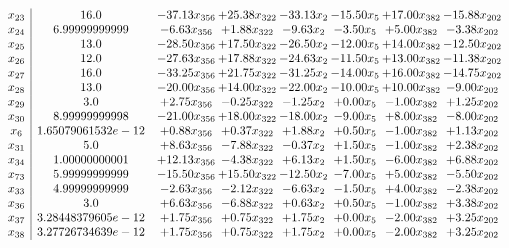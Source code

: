 \documentclass[8pt]{article}
\begin{document}
\[\begin{array}{c| c c@{\hskip 2pt} c@{\hskip 2pt} c@{\hskip 2pt} c@{\hskip 2pt} c@{\hskip 2pt} c@{\hskip 2pt} }
 x_{23}   &  16.0 & -37.13 x_{356} & + 25.38 x_{322} & -33.13 x_{2} & -15.50 x_{5} & + 17.00 x_{382} & -15.88 x_{202}\\
 x_{24}   &  6.99999999999 & -6.63 x_{356} & +  1.88 x_{322} & -9.63 x_{2} & -3.50 x_{5} & +  5.00 x_{382} & -3.38 x_{202}\\
 x_{25}   &  13.0 & -28.50 x_{356} & + 17.50 x_{322} & -26.50 x_{2} & -12.00 x_{5} & + 14.00 x_{382} & -12.50 x_{202}\\
 x_{26}   &  12.0 & -27.63 x_{356} & + 17.88 x_{322} & -24.63 x_{2} & -11.50 x_{5} & + 13.00 x_{382} & -11.38 x_{202}\\
 x_{27}   &  16.0 & -33.25 x_{356} & + 21.75 x_{322} & -31.25 x_{2} & -14.00 x_{5} & + 16.00 x_{382} & -14.75 x_{202}\\
 x_{28}   &  13.0 & -20.00 x_{356} & + 14.00 x_{322} & -22.00 x_{2} & -10.00 x_{5} & + 10.00 x_{382} & -9.00 x_{202}\\
 x_{29}   &  3.0 & +  2.75 x_{356} & -0.25 x_{322} & -1.25 x_{2} & +  0.00 x_{5} & -1.00 x_{382} & +  1.25 x_{202}\\
 x_{30}   &  8.99999999998 & -21.00 x_{356} & + 18.00 x_{322} & -18.00 x_{2} & -9.00 x_{5} & +  8.00 x_{382} & -8.00 x_{202}\\
 x_{6}   &  1.65079061532e-12 & +  0.88 x_{356} & +  0.37 x_{322} & +  1.88 x_{2} & +  0.50 x_{5} & -1.00 x_{382} & +  1.13 x_{202}\\
 x_{31}   &  5.0 & +  8.63 x_{356} & -7.88 x_{322} & -0.37 x_{2} & +  1.50 x_{5} & -1.00 x_{382} & +  2.38 x_{202}\\
 x_{34}   &  1.00000000001 & + 12.13 x_{356} & -4.38 x_{322} & +  6.13 x_{2} & +  1.50 x_{5} & -6.00 x_{382} & +  6.88 x_{202}\\
 x_{73}   &  5.99999999999 & -15.50 x_{356} & + 15.50 x_{322} & -12.50 x_{2} & -7.00 x_{5} & +  5.00 x_{382} & -5.50 x_{202}\\
 x_{33}   &  4.99999999999 & -2.63 x_{356} & -2.12 x_{322} & -6.63 x_{2} & -1.50 x_{5} & +  4.00 x_{382} & -2.38 x_{202}\\
 x_{36}   &  3.0 & +  6.63 x_{356} & -6.88 x_{322} & +  0.63 x_{2} & +  0.50 x_{5} & -1.00 x_{382} & +  3.38 x_{202}\\
 x_{37}   &  3.28448379605e-12 & +  1.75 x_{356} & +  0.75 x_{322} & +  1.75 x_{2} & +  0.00 x_{5} & -2.00 x_{382} & +  3.25 x_{202}\\
 x_{38}   &  3.27726734639e-12 & +  1.75 x_{356} & +  0.75 x_{322} & +  1.75 x_{2} & +  0.00 x_{5} & -2.00 x_{382} & +  3.25 x_{202}\\

\end{array}\]
\end{document}
